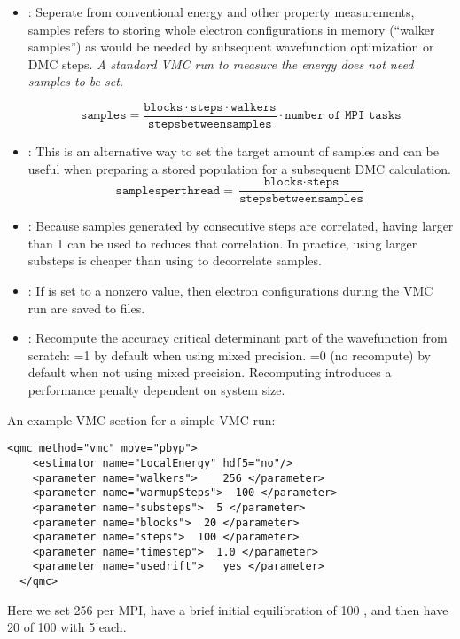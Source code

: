\begin{itemize}
\item {}: Seperate from conventional energy and other
  property measurements, samples refers to storing whole electron
  configurations in memory (``walker samples'') as would be needed by subsequent
  wavefunction optimization or DMC steps. \textit{A standard VMC run to
  measure the energy does not need samples to be set.}

\[
\texttt{samples}=
\frac{\texttt{blocks}\cdot\texttt{steps}\cdot\texttt{walkers}}{\texttt{stepsbetweensamples}}\cdot\texttt{number of MPI tasks}
\]

\item {}: This is an alternative way to set the target amount of samples and can be useful when preparing a stored population for a subsequent DMC calculation.
\[
\texttt{samplesperthread}=
\frac{\texttt{blocks}\cdot\texttt{steps}}{\texttt{stepsbetweensamples}}
\]

\item {}: Because samples generated by consecutive steps are correlated, having  larger than 1 can be used to reduces that correlation. In practice, using larger substeps is cheaper than using  to decorrelate samples. 

\item {}: If  is set to a nonzero value, then electron configurations during the VMC run are saved to files.

\item {}: Recompute the accuracy critical determinant part of the wavefunction
  from scratch: =1 by default when using mixed precision. =0 (no
  recompute) by default when not using mixed precision. Recomputing
  introduces a performance penalty dependent on system size.
\end{itemize}

An example VMC section for a simple VMC run:
\begin{lstlisting}[style=QMCPXML]
  <qmc method="vmc" move="pbyp">
    <estimator name="LocalEnergy" hdf5="no"/>
    <parameter name="walkers">    256 </parameter>
    <parameter name="warmupSteps">  100 </parameter>
    <parameter name="substeps">  5 </parameter>
    <parameter name="blocks">  20 </parameter>
    <parameter name="steps">  100 </parameter>
    <parameter name="timestep">  1.0 </parameter>
    <parameter name="usedrift">   yes </parameter>
  </qmc>
\end{lstlisting}
Here we set 256  per MPI, have a brief initial equilibration of 100 , and then have 20  of 100  with 5  each.

